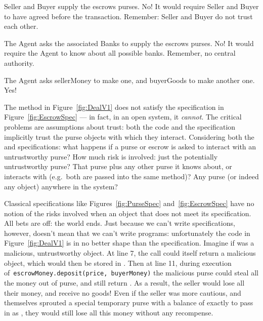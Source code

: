 Seller and Buyer supply the escrows purses.  No! It would require
Seller and Buyer to have agreed before the transaction. Remember:
Seller and Buyer do not trust each other.

The Agent asks the associated Banks to supply the escrows purses.  No!
It would require the Agent to know about all possible banks. Remember,
no central authority.

The Agent asks sellerMoney to make one, and buyerGoods to make another one.
Yes!






The  method in Figure~\ref{fig:DealV1} does not
satisfy the  specification in Figure~\ref{fig:EscrowSpec}
--- in fact, in an open system, it \textit{cannot}.  The critical
problems are assumptions about trust: both the code and the
specification implicitly trust the purse objects with which they interact.
Considering both the  and  specifications: what
happens if a purse or escrow is asked to interact with an
untrustworthy purse?  How much risk is involved: just the potentially
untrustworthy purse? That purse plus any other purse it knows about,
or interacts with (e.g.\ both are passed into the same method)?  Any
purse (or indeed any object) anywhere in the system?

Classical
specifications like Figures~\ref{fig:PurseSpec}
and~\ref{fig:EscrowSpec} have %
no notion of the risks involved when
an object that does not meet its specification. All bets are off: the
world ends.
%
Just because we can't write specifications, however, doesn't mean that we can't
write programs: unfortunately the code in Figure~\ref{fig:DealV1}
is in no better shape than the specification.  Imagine if
 was a malicious, untrustworthy object. At line 7,
the  call could itself return a malicious object, which
would then be stored in . Then at line 11, during
execution of\ \lstinline+escrowMoney.deposit(price, buyerMoney)+ the
malicious  purse could steal all the money out of
 purse, and still return . As a result, the
seller would lose all their money, and receive no goods!  Even if the
seller was more cautious, and themselves sprouted a special temporary
purse with a balance of exactly  to pass in as
, they would still lose all this money without any
recompense.


